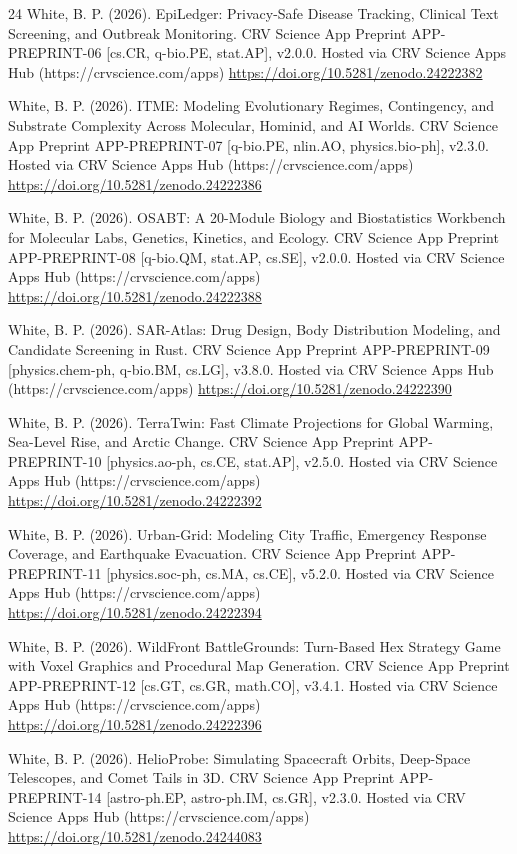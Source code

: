 \documentclass[10pt,letterpaper]{article}
\begin{document}
\begin{thebibliography}{24}
 White, B. P. (2026). EpiLedger: Privacy-Safe Disease Tracking, Clinical Text Screening, and Outbreak Monitoring. CRV Science App Preprint APP-PREPRINT-06 [cs.CR, q-bio.PE, stat.AP], v2.0.0. Hosted via CRV Science Apps Hub (https://crvscience.com/apps) \url{https://doi.org/10.5281/zenodo.24222382}

 White, B. P. (2026). ITME: Modeling Evolutionary Regimes, Contingency, and Substrate Complexity Across Molecular, Hominid, and AI Worlds. CRV Science App Preprint APP-PREPRINT-07 [q-bio.PE, nlin.AO, physics.bio-ph], v2.3.0. Hosted via CRV Science Apps Hub (https://crvscience.com/apps) \url{https://doi.org/10.5281/zenodo.24222386}

 White, B. P. (2026). OSABT: A 20-Module Biology and Biostatistics Workbench for Molecular Labs, Genetics, Kinetics, and Ecology. CRV Science App Preprint APP-PREPRINT-08 [q-bio.QM, stat.AP, cs.SE], v2.0.0. Hosted via CRV Science Apps Hub (https://crvscience.com/apps) \url{https://doi.org/10.5281/zenodo.24222388}

 White, B. P. (2026). SAR-Atlas: Drug Design, Body Distribution Modeling, and Candidate Screening in Rust. CRV Science App Preprint APP-PREPRINT-09 [physics.chem-ph, q-bio.BM, cs.LG], v3.8.0. Hosted via CRV Science Apps Hub (https://crvscience.com/apps) \url{https://doi.org/10.5281/zenodo.24222390}

 White, B. P. (2026). TerraTwin: Fast Climate Projections for Global Warming, Sea-Level Rise, and Arctic Change. CRV Science App Preprint APP-PREPRINT-10 [physics.ao-ph, cs.CE, stat.AP], v2.5.0. Hosted via CRV Science Apps Hub (https://crvscience.com/apps) \url{https://doi.org/10.5281/zenodo.24222392}

 White, B. P. (2026). Urban-Grid: Modeling City Traffic, Emergency Response Coverage, and Earthquake Evacuation. CRV Science App Preprint APP-PREPRINT-11 [physics.soc-ph, cs.MA, cs.CE], v5.2.0. Hosted via CRV Science Apps Hub (https://crvscience.com/apps) \url{https://doi.org/10.5281/zenodo.24222394}

 White, B. P. (2026). WildFront BattleGrounds: Turn-Based Hex Strategy Game with Voxel Graphics and Procedural Map Generation. CRV Science App Preprint APP-PREPRINT-12 [cs.GT, cs.GR, math.CO], v3.4.1. Hosted via CRV Science Apps Hub (https://crvscience.com/apps) \url{https://doi.org/10.5281/zenodo.24222396}

 White, B. P. (2026). HelioProbe: Simulating Spacecraft Orbits, Deep-Space Telescopes, and Comet Tails in 3D. CRV Science App Preprint APP-PREPRINT-14 [astro-ph.EP, astro-ph.IM, cs.GR], v2.3.0. Hosted via CRV Science Apps Hub (https://crvscience.com/apps) \url{https://doi.org/10.5281/zenodo.24244083}


\end{thebibliography}
\end{document}

